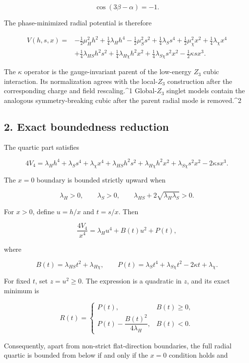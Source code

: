\documentclass[
]{article}
\begin{document}
\[
\cos(3\beta-\alpha)=-1.
\]

The phase-minimized radial potential is therefore

\[
\begin{aligned}
V(h,s,x)={}&-\frac12\mu_H^2h^2+\frac14\lambda_Hh^4
-\frac12\mu_S^2s^2+\frac14\lambda_Ss^4
+\frac12\mu_\chi^2x^2+\frac14\lambda_\chi x^4\\
&+\frac14\lambda_{HS}h^2s^2
+\frac14\lambda_{H\chi}h^2x^2
+\frac14\lambda_{S\chi}s^2x^2
-\frac12\kappa sx^3.
\end{aligned}
\]

The \(\kappa\) operator is the gauge-invariant parent of the low-energy
\(Z_3\) cubic interaction. Its normalization agrees with the
local-\(Z_3\) construction after the corresponding charge and field
rescaling.\^{}1 Global-\(Z_3\) singlet models contain the analogous
symmetry-breaking cubic after the parent radial mode is removed.\^{}2

\hypertarget{exact-boundedness-reduction}{%
\subsection{2. Exact boundedness
reduction}\label{exact-boundedness-reduction}}

The quartic part satisfies

\[
4V_4=\lambda_Hh^4+\lambda_Ss^4+\lambda_\chi x^4
+\lambda_{HS}h^2s^2+\lambda_{H\chi}h^2x^2
+\lambda_{S\chi}s^2x^2-2\kappa sx^3.
\]

The \(x=0\) boundary is bounded strictly upward when

\[
\lambda_H>0,\qquad \lambda_S>0,\qquad
\lambda_{HS}+2\sqrt{\lambda_H\lambda_S}>0.
\]

For \(x>0\), define \(u=h/x\) and \(t=s/x\). Then

\[
\frac{4V_4}{x^4}=\lambda_Hu^4+B(t)u^2+P(t),
\]

where

\[
B(t)=\lambda_{HS}t^2+\lambda_{H\chi},
\qquad
P(t)=\lambda_St^4+\lambda_{S\chi}t^2-2\kappa t+\lambda_\chi.
\]

For fixed \(t\), set \(z=u^2\ge0\). The expression is a quadratic in
\(z\), and its exact minimum is

\[
R(t)=
\begin{cases}
P(t),&B(t)\ge0,\\[3pt]
P(t)-\dfrac{B(t)^2}{4\lambda_H},&B(t)<0.
\end{cases}
\]

Consequently, apart from non-strict flat-direction boundaries, the full
radial quartic is bounded from below if and only if the \(x=0\)
condition holds and
\end{document}
